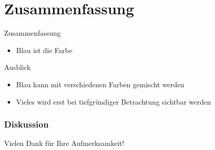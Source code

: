 \section{Zusammenfassung}

\begin{frame}{Zusammenfassung}
	\begin{itemize}
		\item Blau ist die Farbe
	\end{itemize}
	\begin{block}{Ausblick}
	\begin{itemize}
		\item Blau kann mit verschiedenen Farben gemischt werden
		\item Vieles wird erst bei tiefgründiger Betrachtung sichtbar werden
	\end{itemize}		
	\end{block}
\end{frame}



\begin{frame}
	\frametitle{Diskussion}
	\begin{center}
 		Vielen Dank für Ihre Aufmerksamkeit!
	\end{center}
\end{frame}

